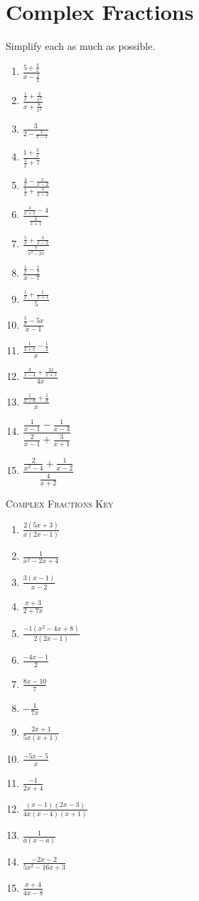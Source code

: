 \chapter{Complex Fractions}

Simplify each as much as possible.

\begin{multicols}{3}
\begin{enumerate}
\setlength\itemsep{10pt}
\item $\frac{5+\frac{3}{x}}{x-\frac{1}{2}}$
\item $\frac{\frac{1}{x}+\frac{2}{x^2}}{x+\frac{8}{x^2}}$
\item $\frac{3}{2-\frac{x}{x-1}}$
\item $\frac{1+\frac{3}{x}}{\frac{2}{x}+7}$
\item $\frac{\frac{4}{x}-\frac{x}{x-2}}{\frac{1}{x}+{\frac{3}{x-2}}}$
\item $\frac{\frac{3}{x+1}-4}{\frac{2}{x+1}}$
\item $\frac{\frac{5}{x}+\frac{3}{x-2}}{\frac{7}{x^2-2x}}$
\item $\frac{\frac{1}{x}-\frac{1}{7}}{x-7}$
\item $\frac{\frac{1}{x}+\frac{1}{x+1}}{5}$
\item $\frac{\frac{5}{x}-5x}{x-1}$
\item $\frac{\frac{1}{2+x}-\frac{1}{2}}{x}$
\item $\frac{\frac{3}{x-4}+\frac{2x}{x+1}}{4x}$
\item $\frac{\frac{1}{x-a}+\frac{1}{a}}{x}$
\item $\dfrac{\frac{1}{x-1}-\frac{1}{x-3}}{\frac{2}{x-1}+\frac{3}{x+1}}$
\item $\dfrac{\frac{2}{x^2-4}+\frac{1}{x-2}}{\frac{4}{x+2}}$
\end{enumerate}
\end{multicols}

\newpage

\textsc{Complex Fractions Key}

\begin{multicols}{3}
\begin{enumerate}
\setlength\itemsep{10pt}
\item $\frac{2(5x+3)}{x(2x-1)}$
\item $\frac{1}{x^2-2x+4}$
\item $\frac{3(x-1)}{x-2}$
\item $\frac{x+3}{2+7x}$
\item $\frac{-1(x^2-4x+8)}{2(2x-1)}$
\item $\frac{-4x-1}{2}$
\item $\frac{8x-10}{7}$
\item $-\frac{1}{7x}$
\item $\frac{2x+1}{5x(x+1)}$
\item $\frac{-5x-5}{x}$
\item $\frac{-1}{2x+4}$
\item $\frac{(x-1)(2x-3)}{4x(x-4)(x+1)}$
\item $\frac{1}{a(x-a)}$
\item $\frac{-2x-2}{5x^2-16x+3}$
\item $\frac{x+4}{4x-8}$
\end{enumerate}
\end{multicols}